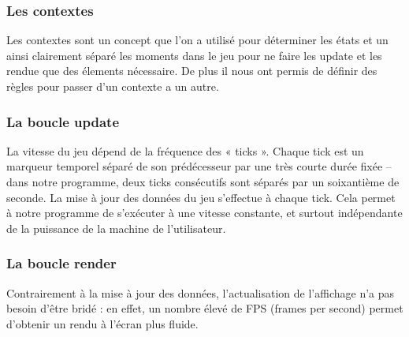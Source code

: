 \subsubsection{Les contextes}

Les contextes sont un concept que l'on a utilisé pour déterminer les états et un ainsi clairement séparé les moments dans le jeu pour ne faire les update et les rendue que des élements nécessaire.
\ml
De plus il nous ont permis de définir des règles pour passer d'un contexte a un autre.


\subsubsection{La boucle update}

La vitesse du jeu dépend de la fréquence des « ticks ». Chaque tick est un marqueur temporel séparé de son prédécesseur par une très courte durée fixée – dans notre programme, deux ticks consécutifs sont séparés par un soixantième de seconde.
\ml\ml
La mise à jour des données du jeu s'effectue à chaque tick. Cela permet à notre programme de s'exécuter à une vitesse constante, et surtout indépendante de la puissance de la machine de l'utilisateur.

\subsubsection{La boucle render}

Contrairement à la mise à jour des données, l'actualisation de l'affichage n'a pas besoin d'être bridé : en effet, un nombre élevé de FPS (frames per second) permet d'obtenir un rendu à l'écran plus fluide.